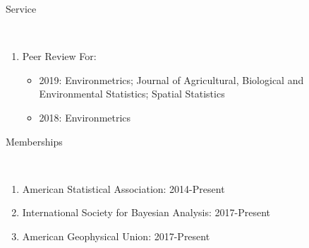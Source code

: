 \documentclass[11pt]{article}
\newcommand{\head}[1]{ %
    \bigskip %
    \begin{large}\begin{bf}{#1}\end{bf}\end{large} %

    \ \\ [-1.3cm] %

    \hrulefill}
\begin{document}
\head{Service}
\begin{enumerate}[label=$\bullet$]
\item Peer Review For:
\begin{itemize}
\item 2019: Environmetrics; Journal of Agricultural, Biological and Environmental Statistics; Spatial Statistics
\item 2018: Environmetrics 
\end{itemize}  
\end{enumerate}


\head{Memberships}

\begin{enumerate}[label=$\bullet$]
\item American Statistical Association: 2014-Present
\item International Society for Bayesian Analysis: 2017-Present
\item American Geophysical Union: 2017-Present
\end{enumerate}



\end{document}
